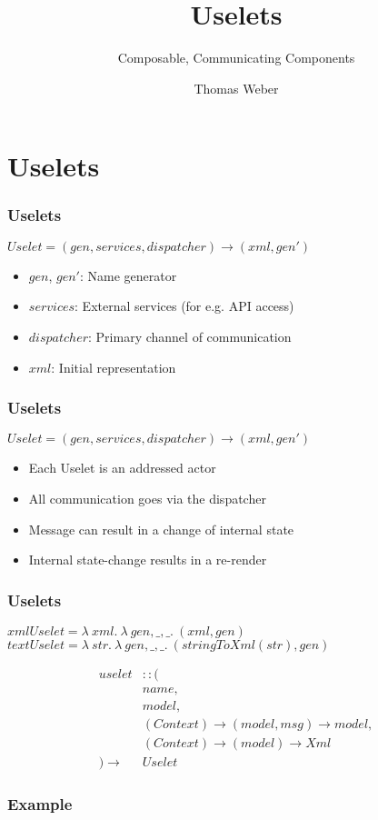 \documentclass{beamer}
\title{Uselets}
\subtitle{Composable, Communicating Components}
\author{Thomas Weber}
\begin{document}
  \frame{\titlepage}
  \section{Uselets}
  \begin{frame}
    \frametitle{Uselets}
	\vspace{14px}
    $Uselet = (gen, services, dispatcher) \rightarrow (xml, gen')$
    \begin{itemize}
      \item $gen$, $gen'$: Name generator
      \item $services$: External services (for e.g. API access)
      \item $dispatcher$: Primary channel of communication
      \item $xml$: Initial representation
    \end{itemize}
  \end{frame}
  \begin{frame}
    \frametitle{Uselets}
	\vspace{14px}
    $Uselet = (gen, services, dispatcher) \rightarrow (xml, gen')$
    \begin{itemize}
      \item Each Uselet is an addressed actor
      \item All communication goes via the dispatcher
      \item Message can result in a change of internal state
      \item Internal state-change results in a re-render
    \end{itemize}
  \end{frame}
  \begin{frame}
    \frametitle{Uselets}

    $xmlUselet = \lambda\ xml.\ \lambda\ gen, \_, \_.\ (xml, gen)$
    $textUselet = \lambda\ str.\ \lambda\ gen, \_, \_.\ (stringToXml(str), gen)$

    \begin{align*}
    uselet&:: (\\
    &name,\\
    &model,\\
    &(Context) \rightarrow (model, msg) \rightarrow model,\\
    &(Context) \rightarrow (model) \rightarrow Xml\\
    ) \rightarrow&Uselet
    \end{align*}
  \end{frame}
  \begin{frame}
    \frametitle{Example}

      

  \end{frame}
\end{document}
